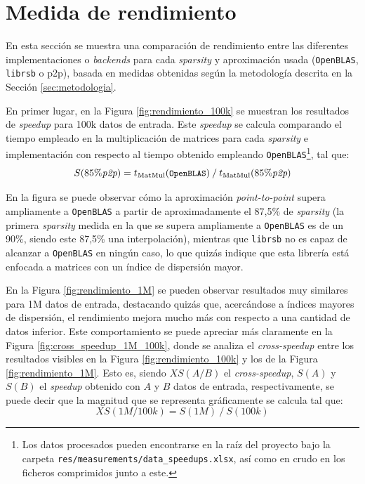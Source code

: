 \section{Medida de rendimiento}
\label{sec:medida_rendimiento}
En esta sección se muestra una comparación de rendimiento entre las diferentes implementaciones o \textit{backends} para cada \textit{sparsity} y aproximación usada (\texttt{OpenBLAS}, \texttt{librsb} o p2p), basada en medidas obtenidas según la metodología descrita en la Sección \ref{sec:metodologia}.

En primer lugar, en la Figura \ref{fig:rendimiento_100k} se muestran los resultados de \textit{speedup} para 100k datos de entrada. Este \textit{speedup} se calcula comparando el tiempo empleado en la multiplicación de matrices para cada \textit{sparsity} e implementación con respecto al tiempo obtenido empleando \texttt{OpenBLAS}\footnote{Los datos procesados pueden encontrarse en la raíz del proyecto bajo la carpeta \texttt{res/measurements/data\_speedups.xlsx}, así como en crudo en los ficheros comprimidos junto a este.}, tal que:
\begin{equation}
    S(85\%\textit{p2p}) = t_{\text{MatMul}}(\texttt{\small OpenBLAS})\: /\: t_{\text{MatMul}}(85\%\textit{p2p})\nonumber
    \label{eq:speedup_example}
\end{equation}

En la figura se puede observar cómo la aproximación \textit{point-to-point} supera ampliamente a \texttt{OpenBLAS} a partir de aproximadamente el 87,5\% de \textit{sparsity} (la primera \textit{sparsity} medida en la que se supera ampliamente a \texttt{OpenBLAS} es de un 90\%, siendo este 87,5\% una interpolación), mientras que \texttt{librsb} no es capaz de alcanzar a \texttt{OpenBLAS} en ningún caso, lo que quizás indique que esta librería está enfocada a matrices con un índice de dispersión mayor.

En la Figura \ref{fig:rendimiento_1M} se pueden observar resultados muy similares para 1M datos de entrada, destacando quizás que, acercándose a índices mayores de dispersión, el rendimiento mejora mucho más con respecto a una cantidad de datos inferior. Este comportamiento se puede apreciar más claramente en la Figura \ref{fig:cross_speedup_1M_100k}, donde se analiza el \textit{cross-speedup} entre los resultados visibles en la Figura \ref{fig:rendimiento_100k} y los de la Figura \ref{fig:rendimiento_1M}. Esto es, siendo $XS(A/B)$ el \textit{cross-speedup}, $S(A)$ y $S(B)$ el \textit{speedup} obtenido con $A$ y $B$ datos de entrada, respectivamente, se puede decir que la magnitud que se representa gráficamente se calcula tal que:
\begin{equation}
    XS(1M/100k) = S(1M)\: /\: S(100k)\nonumber
    \label{eq:cross_speedup}
\end{equation}

